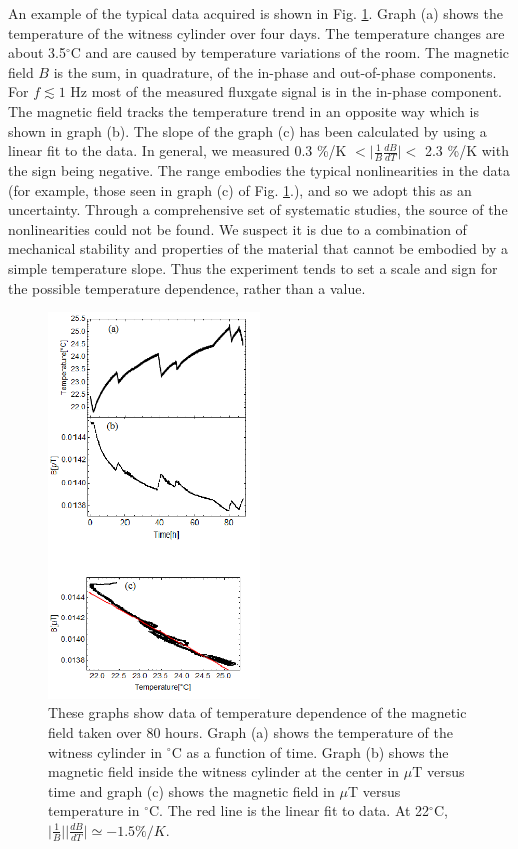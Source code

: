 \documentclass[review]{elsarticle}
\begin{document}
An example of the typical data acquired is shown in Fig. \ref{fig:B_vs_Temp}. Graph (a) shows the temperature of the witness cylinder over four days. The temperature changes are about 3.5$^\circ$C and are caused by temperature variations of the room. The magnetic field $B$ is the sum, in quadrature, of the in-phase and out-of-phase components. For $f\lesssim 1$ Hz most of the measured fluxgate signal is in the in-phase component. The magnetic field tracks the temperature trend in an opposite way which is shown in graph (b). The slope of the graph (c) has been calculated by using a linear fit to the data. In general, we measured 0.3 \%/K $< \vert \frac{1}{B} \frac{dB}{dT} \vert <$ 2.3 \%/K with the sign being negative. The range embodies the typical nonlinearities in the data (for example, those seen in graph (c) of Fig. \ref{fig:B_vs_Temp}.), and so we adopt this as an uncertainty. Through a comprehensive set of systematic studies, the source of the nonlinearities could not be found. We suspect it is due to a combination of mechanical stability and properties of the material that cannot be embodied by a simple temperature slope. Thus the experiment tends to set a scale and sign for the possible temperature dependence, rather than a value.
  \begin{figure}[h!]
\begin{center}
   \includegraphics[width=0.5\textwidth]{B_vs_T.png}
    \caption{These graphs show data of temperature dependence of the magnetic field taken over 80 hours. Graph (a) shows the temperature of the witness cylinder in $^\circ$C as a function of time. Graph (b) shows the magnetic field inside the witness cylinder at the center in $\mu$T versus time and graph (c) shows the magnetic field in $\mu$T versus temperature in $^\circ$C. The red line is the linear fit to data. At 22$^\circ$C, $\vert \frac{1}{B}\vert \vert \frac{dB}{dT}\vert\simeq -1.5 \% /K.$ }
    \label{fig:B_vs_Temp}
     \vspace{-2.em}
    \end{center}
\end{figure} 
\end{document}
